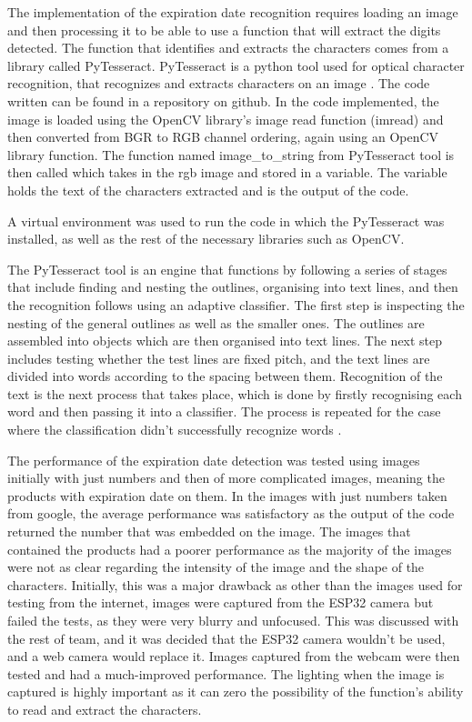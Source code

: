The implementation of the expiration date recognition requires loading an image and then processing it to be able to use a function that will extract the digits detected.
The function that identifies and extracts the characters comes from a library called PyTesseract.
PyTesseract is a python tool used for optical character recognition, that recognizes and extracts characters on an image \cite{pypiPytesseract}.
The code written can be found in a repository on github.
In the code implemented, the image is loaded using the OpenCV library's image read function (imread) and then converted from BGR to RGB channel ordering, again using an OpenCV library function.
The function named image\_to\_string from PyTesseract tool is then called which takes in the rgb image and stored in a variable.
The variable holds the text of the characters extracted and is the output of the code.

A virtual environment was used to run the code in which the PyTesseract was installed, as well as the rest of the necessary libraries such as OpenCV.

The PyTesseract tool is an engine that functions by following a series of stages that include finding and nesting the outlines, organising into text lines, and then the recognition follows using an adaptive classifier.
The first step is inspecting the nesting of the general outlines as well as the smaller ones.
The outlines are assembled into objects which are then organised into text lines.
The next step includes testing whether the test lines are fixed pitch, and the text lines are divided into words according to the spacing between them.
Recognition of the text is the next process that takes place, which is done by firstly recognising each word and then passing it into a classifier.
The process is repeated for the case where the classification didn't successfully recognize words \cite{TesseractOverview}.

The performance of the expiration date detection was tested using images initially with just numbers and then of more complicated images, meaning the products with expiration date on them.
In the images with just numbers taken from google, the average performance was satisfactory as the output of the code returned the number that was embedded on the image.
The images that contained the products had a poorer performance as the majority of the images were not as clear regarding the intensity of the image and the shape of the characters.
Initially, this was a major drawback as other than the images used for testing from the internet, images were captured from the ESP32 camera but failed the tests, as they were very blurry and unfocused.
This was discussed with the rest of team, and it was decided that the ESP32 camera wouldn't be used, and a web camera would replace it.
Images captured from the webcam were then tested and had a much-improved performance.
The lighting when the image is captured is highly important as it can zero the possibility of the function's ability to read and extract the characters.

